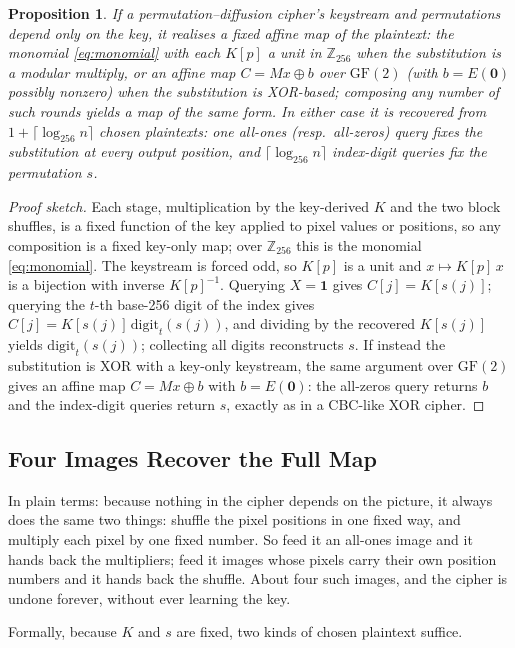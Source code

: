 \documentclass[conference,a4paper]{IEEEtran}
\newtheorem{proposition}{Proposition}
\begin{document}
\begin{proposition}\label{prop:monomial}
If a permutation--diffusion cipher's keystream and permutations depend only on the key, it realises a
fixed \emph{affine} map of the plaintext: the monomial \eqref{eq:monomial} with each $K[p]$ a unit in
$\mathbb{Z}_{256}$ when the substitution is a modular multiply, or an affine map $C=Mx\oplus b$ over
$\mathrm{GF}(2)$ (with $b=E(\mathbf{0})$ possibly nonzero) when the substitution is XOR-based; composing
any number of such rounds yields a map of the same form. In either case it is recovered from
$1+\lceil\log_{256}n\rceil$ chosen plaintexts: one all-ones (resp.\ all-zeros) query fixes the
substitution at every output position, and $\lceil\log_{256}n\rceil$ index-digit queries fix the
permutation $s$.
\end{proposition}
\begin{proof}[Proof sketch]
Each stage, multiplication by the key-derived $K$ and the two block shuffles, is a fixed function of
the key applied to pixel values or positions, so any composition is a fixed key-only map; over
$\mathbb{Z}_{256}$ this is the monomial \eqref{eq:monomial}. The keystream is forced odd, so $K[p]$ is a
unit and $x\mapsto K[p]\,x$ is a bijection with inverse $K[p]^{-1}$. Querying $X=\mathbf{1}$ gives
$C[j]=K[s(j)]$; querying the $t$-th base-256 digit of the index gives
$C[j]=K[s(j)]\,\mathrm{digit}_t(s(j))$, and dividing by the recovered $K[s(j)]$ yields
$\mathrm{digit}_t(s(j))$; collecting all digits reconstructs $s$. If instead the substitution is XOR
with a key-only keystream, the same argument over $\mathrm{GF}(2)$ gives an affine map $C=Mx\oplus b$
with $b=E(\mathbf{0})$: the all-zeros query returns $b$ and the index-digit queries return $s$, exactly
as in a CBC-like XOR cipher.
\end{proof}

\subsection{Four Images Recover the Full Map}
In plain terms: because nothing in the cipher depends on the picture, it always does the same two
things: shuffle the pixel positions in one fixed way, and multiply each pixel by one fixed number. So
feed it an all-ones image and it hands back the multipliers; feed it images whose pixels carry their own
position numbers and it hands back the shuffle. About four such images, and the cipher is undone forever,
without ever learning the key.

Formally, because $K$ and $s$ are fixed, two kinds of chosen plaintext suffice.
\end{document}
